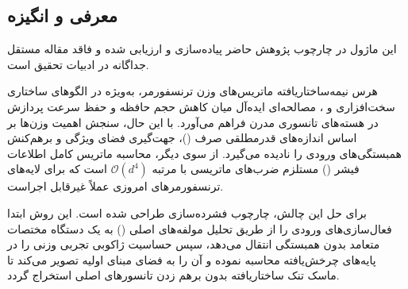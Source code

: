 \subsection{معرفی و انگیزه}
این ماژول در چارچوب پژوهش حاضر پیاده‌سازی و ارزیابی شده و فاقد مقاله مستقل جداگانه در ادبیات تحقیق است.

هرس نیمه‌ساختاریافته ماتریس‌های وزن ترنسفورمر، به‌ویژه در الگوهای ساختاری سخت‌افزاری  و ، مصالحه‌ای ایده‌آل میان کاهش حجم حافظه و حفظ سرعت پردازش در هسته‌های تانسوری مدرن فراهم می‌آورد. با این حال، سنجش اهمیت وزن‌ها بر اساس اندازه‌های قدرمطلقی صرف ()، جهت‌گیری فضای ویژگی و برهم‌کنش همبستگی‌های ورودی را نادیده می‌گیرد. از سوی دیگر، محاسبه ماتریس کامل اطلاعات فیشر () مستلزم ضرب‌های ماتریسی با مرتبه $\mathcal{O}(d^4)$ است که برای لایه‌های ترنسفورمرهای امروزی عملاً غیرقابل اجراست.

برای حل این چالش، چارچوب فشرده‌سازی  طراحی شده است. این روش ابتدا فعال‌سازی‌های ورودی را از طریق تحلیل مولفه‌های اصلی () به یک دستگاه مختصات متعامد بدون همبستگی انتقال می‌دهد، سپس حساسیت ژاکوبی تجربی وزنی را در پایه‌های چرخش‌یافته محاسبه نموده و آن را به فضای مبنای اولیه تصویر می‌کند تا ماسک تنک ساختاریافته  بدون برهم زدن تانسورهای اصلی استخراج گردد.
